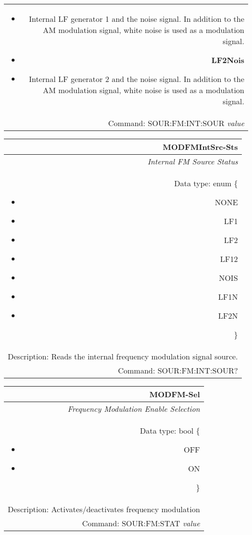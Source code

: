 \documentclass[openany]{article}
\begin{document}
\begin{tabular}{N}
\begin{itemize}[noitemsep]
                                \item[] Internal LF generator 1 and the noise signal. In addition to the AM modulation signal, white noise is used as a modulation signal.
                                \item[] \textbf{LF2Nois}
                                \item[] Internal LF generator 2 and the noise signal. In addition to the AM modulation signal, white noise is used as a modulation signal.
			\end{itemize} \\
			Command: SOUR:FM:INT:SOUR \emph{value} \\

		\end{tabular}


		\begin{tabular}{N}
			\hline
			\bfseries MODFMIntSrc-Sts \\ \hline
			\emph{Internal FM Source Status} \\
			Data type: enum \{\begin{itemize}[noitemsep]
				\small
				\item[] NONE
				\item[] LF1
				\item[] LF2
				\item[] LF12
				\item[] NOIS
				\item[] LF1N
				\item[] LF2N
			\end{itemize}\} \\ 
			Description: Reads the internal frequency modulation signal source. \\
			Command: SOUR:FM:INT:SOUR? \\

		\end{tabular}
%
		\begin{tabular}{N}
			\hline
			\bfseries MODFM-Sel \\ \hline
			\emph{Frequency Modulation Enable Selection} \\
			Data type: bool \{\begin{itemize}[noitemsep]
				\small
				\item[] OFF
				\item[] ON
			\end{itemize}\} \\
			Description: Activates/deactivates frequency modulation\\
			Command: SOUR:FM:STAT \emph{value} \\

		\end{tabular}
\end{document}
